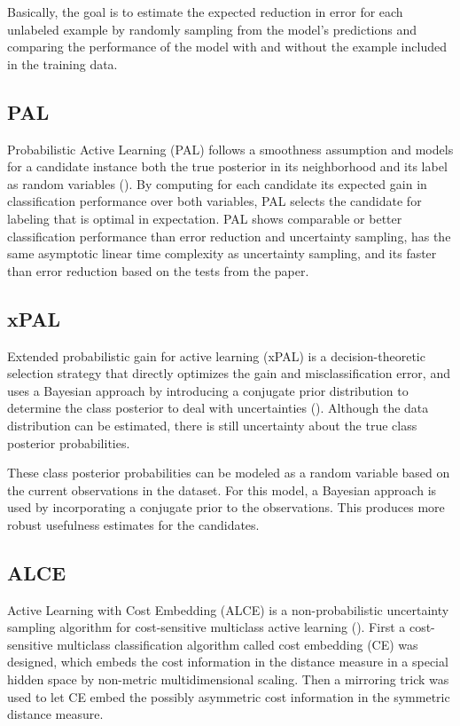 Basically, the goal is to estimate the expected reduction in error for each unlabeled example by randomly sampling from the model's predictions and comparing the performance of the model with and without the example included in the training data.

\subsection{PAL}

Probabilistic Active Learning (PAL) follows a smoothness assumption and models for a candidate instance both the true posterior in its neighborhood and its label as random variables (\cite{kottke2014pal}). By computing for each candidate its expected gain in classification performance over both variables, PAL selects the candidate for labeling that is optimal in expectation. PAL shows comparable or better classification performance than error reduction and uncertainty sampling, has the same asymptotic linear time complexity as uncertainty sampling, and its faster than error reduction based on the tests from the paper.

\subsection{xPAL}

Extended probabilistic gain for active learning (xPAL) is a decision-theoretic selection strategy that directly optimizes the gain and misclassification error, and uses a Bayesian approach by introducing a conjugate prior distribution to determine the class posterior to deal with uncertainties (\cite{kottke2021toward}). Although the data distribution can be estimated, there is still uncertainty about the true class posterior probabilities. 

These class posterior probabilities can be modeled as a random variable based on the current observations in the dataset. For this model, a Bayesian approach is used by incorporating a conjugate prior to the observations. This produces more robust usefulness estimates for the candidates.

\subsection{ALCE}

Active Learning with Cost Embedding (ALCE) is a non-probabilistic uncertainty sampling algorithm for cost-sensitive multiclass active learning (\cite{huang2016alce}). First a cost-sensitive multiclass classification algorithm called cost embedding (CE) was designed, which embeds the cost information in the distance measure in a special hidden space by non-metric multidimensional scaling. Then a mirroring trick was used to let CE embed the possibly asymmetric cost information in the symmetric distance measure.

